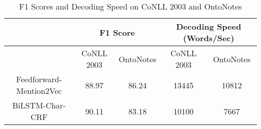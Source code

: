 \begin{table}[]
\centering
\caption{F1 Scores and Decoding Speed on CoNLL 2003 and OntoNotes }
\label{table:my-label3}
\begin{tabular}{|c|c|c|c|c|}
\hline
& \multicolumn{2}{c|}{F1 Score} & \multicolumn{2}{c|}{Decoding Speed (Words/Sec)} \\ \hline
& CoNLL 2003     & OntoNotes    & CoNLL 2003              & OntoNotes             \\ \hline
Feedforward-Mention2Vec & 88.97          & 86.24        & 13445                   & 10812                 \\ \hline
BiLSTM-Char-CRF         & 90.11          & 83.18        & 10100                   & 7667                  \\ \hline
\end{tabular}
\end{table}

